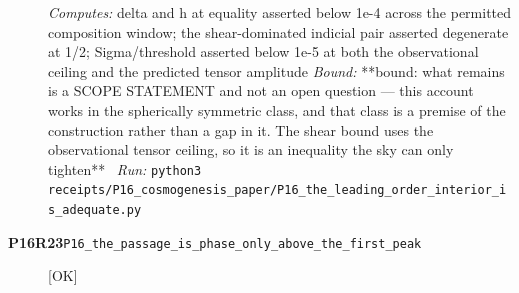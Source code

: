 \begin{description}
\emph{Computes:} delta and h at equality asserted below 1e-4 across the permitted composition window; the shear-dominated indicial pair asserted degenerate at 1/2; Sigma/threshold asserted below 1e-5 at both the observational ceiling and the predicted tensor amplitude
 \emph{Bound:} **bound: what remains is a SCOPE STATEMENT and not an open question --- this account works in the spherically symmetric class, and that class is a premise of the construction rather than a gap in it. The shear bound uses the observational tensor ceiling, so it is an inequality the sky can only tighten**
\ \emph{Run:} \texttt{python3 receipts/P16\_cosmogenesis\_paper/P16\_the\_leading\_order\_interior\_is\_adequate.py}
\item[\rcptlabel{P16_the_passage_is_phase_only_above_the_first_peak}{P16R23}\textbf{P16R23}\quad\texttt{P16\_the\_passage\_is\_phase\_only\_above\_the\_first\_peak}]\hfill\textsf{[OK]}\\

\end{description}
